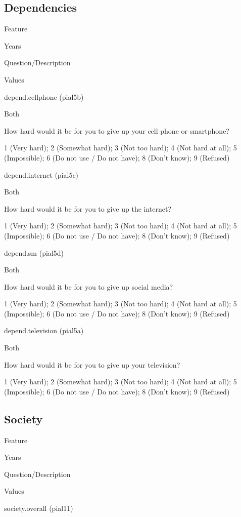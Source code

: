\documentclass[]{book}
\begin{document}
\subsection*{Dependencies}\label{dependencies}

Feature

Years

Question/Description

Values

depend.cellphone (pial5b)

Both

How hard would it be for you to give up your cell phone or smartphone?

1 (Very hard); 2 (Somewhat hard); 3 (Not too hard); 4 (Not hard at all);
5 (Impossible); 6 (Do not use / Do not have); 8 (Don't know); 9
(Refused)

depend.internet (pial5c)

Both

How hard would it be for you to give up the internet?

1 (Very hard); 2 (Somewhat hard); 3 (Not too hard); 4 (Not hard at all);
5 (Impossible); 6 (Do not use / Do not have); 8 (Don't know); 9
(Refused)

depend.sm (pial5d)

Both

How hard would it be for you to give up social media?

1 (Very hard); 2 (Somewhat hard); 3 (Not too hard); 4 (Not hard at all);
5 (Impossible); 6 (Do not use / Do not have); 8 (Don't know); 9
(Refused)

depend.television (pial5a)

Both

How hard would it be for you to give up your television?

1 (Very hard); 2 (Somewhat hard); 3 (Not too hard); 4 (Not hard at all);
5 (Impossible); 6 (Do not use / Do not have); 8 (Don't know); 9
(Refused)

\subsection*{Society}\label{society}

Feature

Years

Question/Description

Values

society.overall (pial11)
\end{document}
